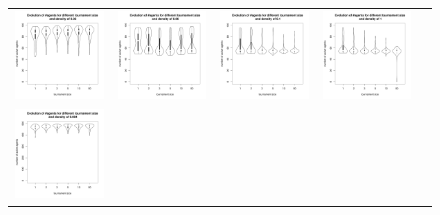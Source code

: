\documentclass[a4paper]{article}
\begin{document}

\begin{figure}
    \begin{tabular}[H]{lcccc}
	\includegraphics[width=.25\textwidth]{img/100/agentwrtK_D-0020.pdf} &
	\includegraphics[width=.25\textwidth]{img/100/agentwrtK_D-0060.pdf} &
	\includegraphics[width=.25\textwidth]{img/100/agentwrtK_D-0100.pdf} &
	\includegraphics[width=.25\textwidth]{img/100/agentwrtK_D-1000.pdf} \\
	\includegraphics[width=.25\textwidth]{img/500/agentwrtK_D-0004.pdf} &

\end{tabular}
\end{figure}
\end{document}
